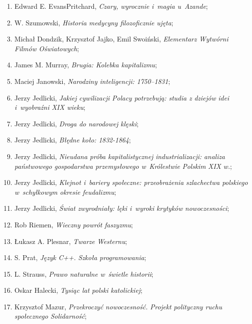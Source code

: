 \documentclass[a4paper,11pt]{article}
\begin{document}
\begin{enumerate}
\item Edward E. Evans\dywiz Pritchard, \emph{Czary, wyrocznie i~magia
    u~Azande};

\item W. Szumowski, \emph{Historia medycyny filozoficznie ujęta};

\item Michał Dondzik, Krzysztof Jajko, Emil Swoiński, \emph{Elementarz
    Wytwórni Filmów Oświatowych};

\item James M. Murray, \emph{Brugia: Kolebka kapitalizmu};

\item Maciej Janowski, \emph{Narodziny inteligencji: 1750--1831};

\item Jerzy Jedlicki, \emph{Jakiej cywilizacji Polacy potrzebują:
    studia z dziejów idei i~wyobraźni XIX wieku};

\item Jerzy Jedlicki, \emph{Droga do narodowej klęski};

\item Jerzy Jedlicki, \emph{Błędne koło: 1832-1864};

\item Jerzy Jedlicki, \emph{Nieudana próba kapitalistycznej
    industrializacji: analiza państwowego gospodarstwa przemysłowego
    w~Królestwie Polskim XIX w.};

\item Jerzy Jedlicki, \emph{Klejnot i~bariery społeczne: przeobrażenia
    szlachectwa polskiego w~schyłkowym okresie feudalizmu};

\item Jerzy Jedlicki, \emph{Świat zwyrodniały: lęki i~wyroki krytyków
    nowoczesności};

\item Rob Riemen, \emph{Wieczny powrót faszyzmu};

\item Łukasz A. Plesnar, \emph{Twarze Westernu};

\item S. Prat, \emph{Język C++. Szkoła programowania};

\item L. Strauss, \emph{Prawo naturalne w~świetle historii};

\item Oskar Halecki, \emph{Tysiąc lat polski katolickiej};

\item Krzysztof Mazur, \emph{Przekroczyć nowoczesność. Projekt
    polityczny ruchu społecznego Solidarność};


\end{enumerate}
\end{document}
